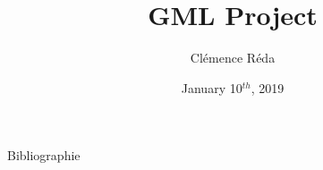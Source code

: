 \documentclass[10pt,frenchb]{beamer}
\author{Cl\'{e}mence R\'{e}da}
\title[GML Project]{GML Project}
\date{January 10$^{th}$, 2019}
\begin{document}
\maketitle

\begin{frame}[allowframebreaks]{Bibliographie}
 

\end{frame}
\end{document}
